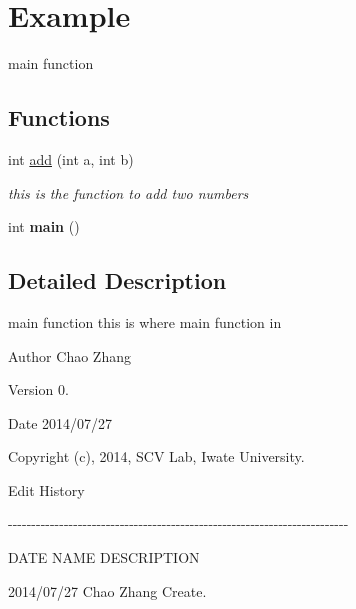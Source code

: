 \hypertarget{group__example}{\section{\-Example}
\label{group__example}
}


main function  


\subsection*{\-Functions}
\begin{DoxyCompactItemize}
\item 
\hypertarget{group__example_gaa99823a0fc8313c9c32541ce768fb801}{int \hyperlink{group__example_gaa99823a0fc8313c9c32541ce768fb801}{add} (int a, int b)}\label{group__example_gaa99823a0fc8313c9c32541ce768fb801}

\begin{DoxyCompactList}\small\item\em this is the function to add two numbers \end{DoxyCompactList}\item 
\hypertarget{group__example_gae66f6b31b5ad750f1fe042a706a4e3d4}{int {\bfseries main} ()}\label{group__example_gae66f6b31b5ad750f1fe042a706a4e3d4}

\end{DoxyCompactItemize}


\subsection{\-Detailed \-Description}
main function this is where main function in

\begin{DoxyAuthor}{\-Author}
\-Chao \-Zhang 
\end{DoxyAuthor}
\begin{DoxyVersion}{\-Version}
0. 
\end{DoxyVersion}
\begin{DoxyDate}{\-Date}
2014/07/27
\end{DoxyDate}
\-Copyright (c), 2014, \-S\-C\-V \-Lab, \-Iwate \-University.

\-Edit \-History \par
 -\/-\/-\/-\/-\/-\/-\/-\/-\/-\/-\/-\/-\/-\/-\/-\/-\/-\/-\/-\/-\/-\/-\/-\/-\/-\/-\/-\/-\/-\/-\/-\/-\/-\/-\/-\/-\/-\/-\/-\/-\/-\/-\/-\/-\/-\/-\/-\/-\/-\/-\/-\/-\/-\/-\/-\/-\/-\/-\/-\/-\/-\/-\/-\/-\/-\/-\/-\/-\/-\/-\/-\/-\/\par
 \-D\-A\-T\-E \-N\-A\-M\-E \-D\-E\-S\-C\-R\-I\-P\-T\-I\-O\-N \par
 2014/07/27 \-Chao \-Zhang \-Create.\par
 